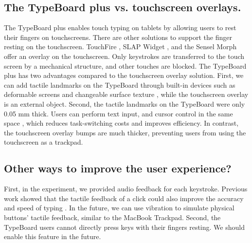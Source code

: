 \subsection{The TypeBoard plus vs. touchscreen overlays.}

The TypeBoard plus enables touch typing on tablets by allowing users to rest their fingers on touchscreens. There are other solutions to support the finger resting on the touchscreen. TouchFire \cite{2020-TouchFire}, SLAP Widget \cite{2008-Slap}, and the Sensel Morph \cite{Website-Morph} offer an overlay on the touchscreen. Only keystrokes are transferred to the touch screen by a mechanical structure, and other touches are blocked. The TypeBoard plus has two advantages compared to the touchscreen overlay solution.
First, we can add tactile landmarks on the TypeBoard through built-in devices such as deformable screens \cite{Website-Tactus} and changeable surface texture \cite{2011-Stimtac, 2010-TeslaTouch, 2011-Enhancing}, while the touchscreen overlay is an external object.
Second, the tactile landmarks on the TypeBoard were only 0.05 mm thick. Users can perform text input, and cursor control in the same space \cite{2016-TapBoard2}, which reduces task-switching costs and improves efficiency. In contrast, the touchscreen overlay bumps are much thicker, preventing users from using the touchscreen as a trackpad.

\subsection{Other ways to improve the user experience?}

First, in the experiment, we provided audio feedback for each keystroke. Previous work showed that the tactile feedback of a click could also improve the accuracy and speed of typing \cite{2015-Haptic}. In the future, we can use vibration to simulate physical buttons' tactile feedback, similar to the MacBook Trackpad.
Second, the TypeBoard users cannot directly press keys with their fingers resting. We should enable this feature in the future.



